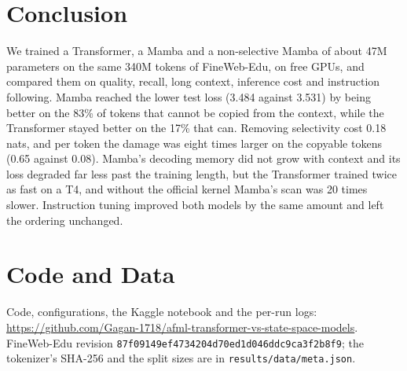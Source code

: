 \documentclass[conference]{IEEEtran}
\begin{document}
\section{Conclusion}
We trained a Transformer, a Mamba and a non-selective Mamba of about 47M parameters on the same 340M
tokens of FineWeb-Edu, on free GPUs, and compared them on quality, recall, long context, inference cost
and instruction following. Mamba reached the lower test loss (3.484 against 3.531) by being better on
the 83\% of tokens that cannot be copied from the context, while the Transformer stayed better on the
17\% that can. Removing selectivity cost 0.18 nats, and per token the damage was eight times larger
on the copyable tokens (0.65 against 0.08). Mamba's
decoding memory did not grow with context and its loss degraded far less past the training length,
but the Transformer trained twice as fast on a T4, and without the official kernel Mamba's scan was
20 times slower. Instruction tuning improved both models by the same amount and left the ordering
unchanged.

\section*{Code and Data}
Code, configurations, the Kaggle notebook and the per-run logs:
\url{https://github.com/Gagan-1718/afml-transformer-vs-state-space-models}. FineWeb-Edu revision
\texttt{87f09149ef4734204d70ed1d046ddc9ca3f2b8f9}; the tokenizer's SHA-256 and the split sizes are in
\texttt{results/data/meta.json}.
\end{document}
